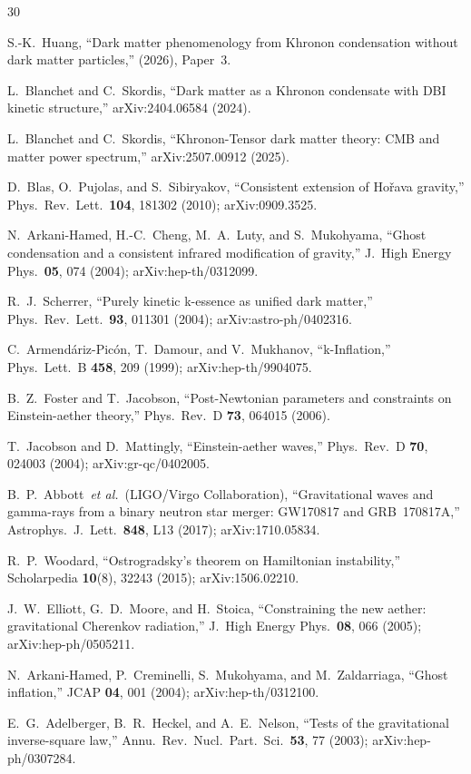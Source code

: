 \documentclass[prd,twocolumn,superscriptaddress,longbibliography,floatfix]{revtex4-2}
\begin{document}
\begin{thebibliography}{30}

S.-K.~Huang,
``Dark matter phenomenology from Khronon condensation
without dark matter particles,''
(2026), Paper~3.

L.~Blanchet and C.~Skordis,
``Dark matter as a Khronon condensate with DBI kinetic structure,''
arXiv:2404.06584 (2024).

L.~Blanchet and C.~Skordis,
``Khronon-Tensor dark matter theory: CMB and matter
power spectrum,''
arXiv:2507.00912 (2025).

D.~Blas, O.~Pujolas, and S.~Sibiryakov,
``Consistent extension of Ho\v{r}ava gravity,''
Phys.\ Rev.\ Lett.\ \textbf{104}, 181302 (2010);
arXiv:0909.3525.

N.~Arkani-Hamed, H.-C.~Cheng, M.~A.~Luty, and S.~Mukohyama,
``Ghost condensation and a consistent infrared modification
of gravity,''
J.\ High Energy Phys.\ \textbf{05}, 074 (2004);
arXiv:hep-th/0312099.

R.~J.~Scherrer,
``Purely kinetic k-essence as unified dark matter,''
Phys.\ Rev.\ Lett.\ \textbf{93}, 011301 (2004);
arXiv:astro-ph/0402316.

C.~Armend\'{a}riz-Pic\'{o}n, T.~Damour, and V.~Mukhanov,
``k-Inflation,''
Phys.\ Lett.\ B \textbf{458}, 209 (1999);
arXiv:hep-th/9904075.

B.~Z.~Foster and T.~Jacobson,
``Post-Newtonian parameters and constraints on Einstein-aether
theory,''
Phys.\ Rev.\ D \textbf{73}, 064015 (2006).

T.~Jacobson and D.~Mattingly,
``Einstein-aether waves,''
Phys.\ Rev.\ D \textbf{70}, 024003 (2004);
arXiv:gr-qc/0402005.

B.~P.~Abbott~\emph{et al.}\ (LIGO/Virgo Collaboration),
``Gravitational waves and gamma-rays from a binary neutron star
merger: GW170817 and GRB~170817A,''
Astrophys.\ J.\ Lett.\ \textbf{848}, L13 (2017);
arXiv:1710.05834.

R.~P.~Woodard,
``Ostrogradsky's theorem on Hamiltonian instability,''
Scholarpedia \textbf{10}(8), 32243 (2015);
arXiv:1506.02210.

J.~W.~Elliott, G.~D.~Moore, and H.~Stoica,
``Constraining the new aether: gravitational Cherenkov
radiation,''
J.\ High Energy Phys.\ \textbf{08}, 066 (2005);
arXiv:hep-ph/0505211.

N.~Arkani-Hamed, P.~Creminelli, S.~Mukohyama, and
M.~Zaldarriaga,
``Ghost inflation,''
JCAP \textbf{04}, 001 (2004);
arXiv:hep-th/0312100.

E.~G.~Adelberger, B.~R.~Heckel, and A.~E.~Nelson,
``Tests of the gravitational inverse-square law,''
Annu.\ Rev.\ Nucl.\ Part.\ Sci.\ \textbf{53}, 77 (2003);
arXiv:hep-ph/0307284.

\end{thebibliography}
\end{document}
